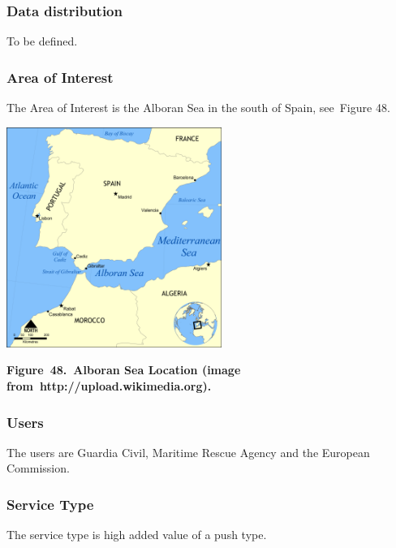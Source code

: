 \documentclass[a4paper]{article}
\begin{document}
\bigskip

\subsubsection[Data distribution]{ Data
distribution}
\hypertarget{Toc381777263}{}{
To be defined.}

\subsubsection[Area of Interest\ ]{ Area of
Interest\ }
\hypertarget{Toc381777264}{}\foreignlanguage{english}{The Area of
Interest is the Alboran Sea in the south of Spain, see\ }Figure
48\foreignlanguage{english}{.}


\bigskip

{\centering 
\includegraphics[width=2.76092in,height=2.82543in]{out-img56.png} \par}

{\centering\bfseries
\label{bkm:Ref377554444}Figure\ 48.\ Alboran Sea Location (image
from\ http://upload.wikimedia.org).
\par}

\subsubsection[Users]{ Users}
\hypertarget{Toc381777265}{}{
The users are Guardia Civil, Maritime Rescue Agency and the European
Commission.}

\subsubsection[Service Type]{ Service Type}
\hypertarget{Toc381777266}{}{
The service type is high added value of a push type.\ }
\end{document}
